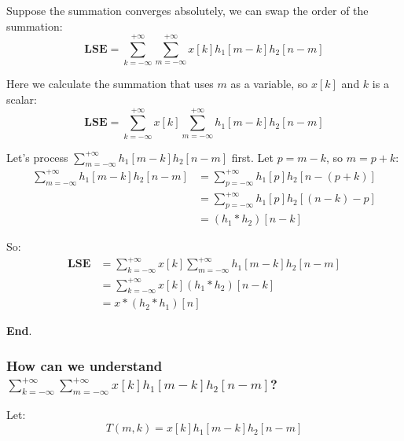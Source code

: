     Suppose the summation converges absolutely, we can swap the order of the summation:
        \begin{equation}
            \mathbf{LSE} =\sum_{k=-\infty}^{+\infty} \sum_{m=-\infty}^{+\infty}  x[k]h_1[m-k] h_2[n-m]
        \end{equation}
    
    Here we calculate the summation that uses $m$ as a variable, so $x[k]$ and $k$ is a scalar:
        \begin{equation}
            \mathbf{LSE} =\sum_{k=-\infty}^{+\infty}x[k] \boxed{\sum_{m=-\infty}^{+\infty}  h_1[m-k] h_2[n-m]}
        \end{equation}

    Let's process $\sum_{m=-\infty}^{+\infty}  h_1[m-k] h_2[n-m]$ first. Let $p=m-k$, so $m=p+k$:
        \begin{equation}
            \begin{aligned}
                \sum_{m=-\infty}^{+\infty}  h_1[m-k] h_2[n-m] &= \sum_{p=-\infty}^{+\infty}  h_1[p] h_2[n-(p+k)] \\
                                                              &= \sum_{p=-\infty}^{+\infty}  h_1[p] h_2[(n-k)-p] \\
                                                              &= (h_1 \ast h_2)[n-k]
            \end{aligned}
        \end{equation}
    
    So:
        \begin{equation}
            \begin{aligned}
                \mathbf{LSE} &=\sum_{k=-\infty}^{+\infty}x[k] \boxed{\sum_{m=-\infty}^{+\infty}  h_1[m-k] h_2[n-m]}\\
                             &= \sum_{k=-\infty}^{+\infty}x[k] (h_1 \ast h_2)[n-k]\\
                             &= x* (h_2\ast h_1)[n]
            \end{aligned}
        \end{equation}
    
    \noindent \textbf{End}.
    
    \subsubsection{How can we understand $\sum_{k=-\infty}^{+\infty} \sum_{m=-\infty}^{+\infty}  x[k]h_1[m-k] h_2[n-m]$? }

    Let:
        \begin{equation}
            T(m,k) = x[k]h_1[m-k] h_2[n-m]
        \end{equation}
    
